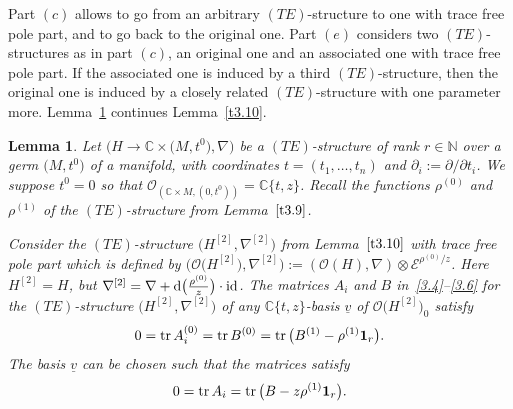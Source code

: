 \documentclass[10pt,a4paper]{amsart}
\numberwithin{equation}{section}
\numberwithin{figure}{section}
\newcommand{\N}{{\mathbb N}}
\newcommand{\C}{{\mathbb C}}
\newcommand{\EE}{{\mathcal E}}
\newcommand{\OO}{{\mathcal O}}
\newcommand{\uuuu}{\underline}
\newcommand{\paa}{\partial}
\newcommand{\nnn}{\nabla}
\DeclareMathOperator{\id}{id}
\DeclareMathOperator{\tr}{tr}
\newtheorem{Lemma}[Theorem]{Lemma}
\begin{document}
Part $(c)$ allows to go from an arbitrary $(TE)$-structure to one
with trace free pole part, and to go back to the original one.
Part $(e)$ considers two $(TE)$-structures as in part $(c)$,
an original one and an associated one with trace free pole part.
If the associated one is induced by a third $(TE)$-structure,
then the original one is induced by a closely related
$(TE)$-structure with one parameter more.
Lemma~\ref{t3.11} continues Lemma~\ref{t3.10}.


\begin{Lemma}\label{t3.11}
Let $\big(H\to\C\times \big(M,t^0\big),\nnn\big)$ be a $(TE)$-structure
of rank $r\in\N$ over a germ $\big(M,t^0\big)$ of a manifold,
with coordinates $t=(t_1,\dots ,t_n)$ and $\paa_i:=\paa/\paa t_i$.
We suppose $t^0=0$ so that $\OO_{(\C\times M,(0,t^0))}=\C\{t,z\}$.
Recall the functions $\rho^{(0)}$ and $\rho^{(1)}$
of the $(TE)$-structure from Lemma~$\ref{t3.9}$.

Consider the $(TE)$-structure
$\big(H^{[2]},\nnn^{[2]}\big)$ from Lemma~$\ref{t3.10}$
with trace free pole part which is defined by
$\big(\OO\big(H^{[2]}\big),\nnn^{[2]}\big):= (\OO(H),\nnn)\otimes \EE^{\rho^{(0)}/z}$.
Here $H^{[2]}=H$, but
$\nnn^{[2]}=\nnn+{\rm d}\big(\frac{\rho^{(0)}}{z}\big)\cdot\id$.
The matrices $A_i$ and $B$ in~\eqref{3.4}--\eqref{3.6}
for the $(TE)$-structure $\big(H^{[2]},\nnn^{[2]}\big)$
of any $\C\{t,z\}$-basis $\uuuu{v}$ of $\OO\big(H^{[2]}\big)_0$
satisfy
\begin{gather}\label{3.18}
0=\tr A_i^{(0)}=\tr B^{(0)}=\tr \big(B^{(1)}-\rho^{(1)}{\bf 1}_r\big).
\end{gather}
The basis $\uuuu{v}$ can be chosen such that
the matrices satisfy
\begin{eqnarray}\label{3.19}
0=\tr A_i=\tr\big(B-z\rho^{(1)}{\bf 1}_r\big).
\end{eqnarray}
\end{Lemma}
\end{document}
